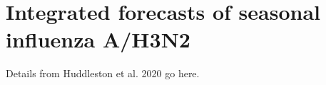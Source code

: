 \chapter{Integrated forecasts of seasonal influenza A/H3N2}

Details from Huddleston et al. 2020 go here.

